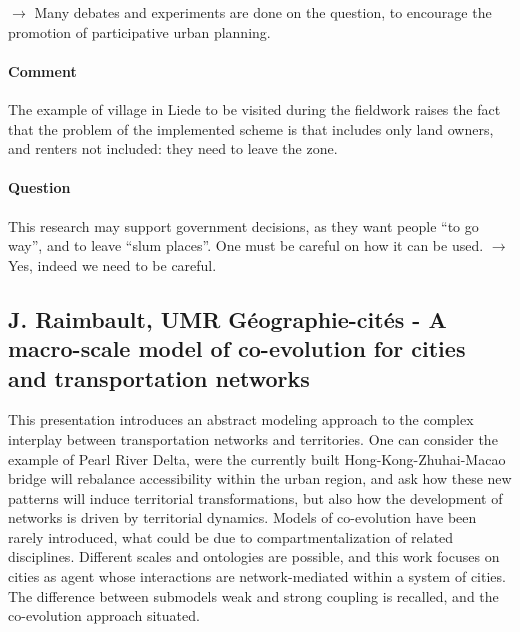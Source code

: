 \documentclass[10pt]{article}
\begin{document}
$\rightarrow$ Many debates and experiments are done on the question, to encourage the promotion of participative urban planning.

\paragraph{Comment}

The example of village in Liede to be visited during the fieldwork raises the fact that the problem of the implemented scheme is that includes only land owners, and renters not included: they need to leave the zone.

\paragraph{Question}

This research may support government decisions, as they want people ``to go way'', and to leave ``slum places''. One must be careful on how it can be used. $\rightarrow$ Yes, indeed we need to be careful.






\subsection*{J. Raimbault, UMR G{\'e}ographie-cit{\'e}s - A macro-scale model of co-evolution for cities and transportation networks}


This presentation introduces an abstract modeling approach to the complex interplay between transportation networks and territories. One can consider the example of Pearl River Delta, were the currently built Hong-Kong-Zhuhai-Macao bridge will rebalance accessibility within the urban region, and ask how these new patterns will induce territorial transformations, but also how the development of networks is driven by territorial dynamics. Models of co-evolution have been rarely introduced, what could be due to compartmentalization of related disciplines. Different scales and ontologies are possible, and this work focuses on cities as agent whose interactions are network-mediated within a system of cities. The difference between submodels weak and strong coupling is recalled, and the co-evolution approach situated.
\end{document}
